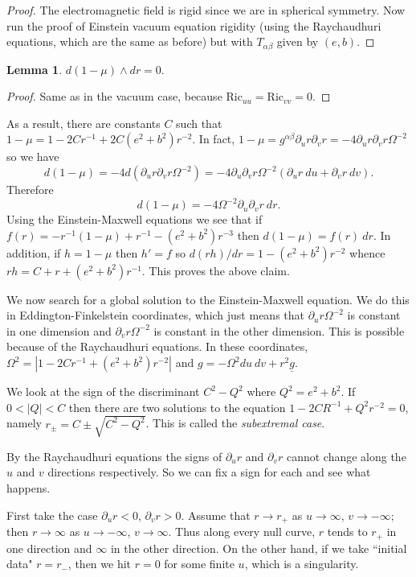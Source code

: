 \documentclass[12pt]{report}
\newcommand{\Ric}{\text{Ric}}
\newcommand{\dfn}[1]{\emph{#1}\index{#1}}
\theoremstyle{definition}
\newtheorem{lemma}[theorem]{Lemma}
\theoremstyle{remark}
\begin{document}
\begin{proof}
    The electromagnetic field is rigid since we are in spherical symmetry. Now run the proof of Einstein vacuum equation rigidity (using the Raychaudhuri equations, which are the same as before) but with $T_{\alpha\beta}$ given by $(e, b)$.
\end{proof}
\begin{lemma}
    $d(1 - \mu) \wedge dr = 0$.
\end{lemma}
\begin{proof}
    Same as in the vacuum case, because $\Ric_{uu} = \Ric_{vv} = 0$.
\end{proof}
As a result, there are constants $C$ such that $1 - \mu = 1 - 2Cr^{-1} + 2C(e^2 + b^2)r^{-2}$. In fact, $1 - \mu = g^{\alpha\beta} \partial_u r \partial_v r = -4\partial_u r \partial_vr \Omega^{-2}$ so we have
$$d(1 - \mu) = -4d(\partial_u r \partial_v r\Omega^{-2}) = -4 \partial_u\partial_vr \Omega^{-2} (\partial_ur ~du + \partial_vr ~dv).$$
Therefore
$$d(1 - \mu) = -4\Omega^{-2}\partial_u\partial_vr ~dr.$$
Using the Einstein-Maxwell equations we see that if $f(r) = -r^{-1}(1 - \mu) + r^{-1} - (e^2 + b^2)r^{-3}$ then $d(1 - \mu) = f(r) ~dr$. In addition, if $h = 1 - \mu$ then $h' = f$ so $d(rh)/dr = 1 - (e^2 + b^2)r^{-2}$ whence $rh = C + r + (e^2 + b^2)r^{-1}$. This proves the above claim.

We now search for a global solution to the Einstein-Maxwell equation. We do this in Eddington-Finkelstein coordinates, which just means that $\partial_ur \Omega^{-2}$ is constant in one dimension and $\partial_vr \Omega^{-2}$ is constant in the other dimension. This is possible because of the Raychaudhuri equations. In these coordinates, $\Omega^2 = |1 - 2Cr^{-1} + (e^2 + b^2)r^{-2}|$ and $g = -\Omega^2 du~dv + r^2 \underline g$.

We look at the sign of the discriminant $C^2 - Q^2$ where $Q^2 = e^2 + b^2$. If $0 < |Q| < C$ then there are two solutions to the equation $1 - 2CR^{-1} + Q^2r^{-2} = 0$, namely $r_\pm = C \pm \sqrt{C^2 - Q^2}$. This is called the \dfn{subextremal case}.

By the Raychaudhuri equations the signs of $\partial_ur$ and $\partial_vr$ cannot change along the $u$ and $v$ directions respectively. So we can fix a sign for each and see what happens.

First take the case $\partial_ur < 0$, $\partial_vr > 0$. Assume that $r \to r_+$ as $u \to \infty$, $v \to -\infty$; then $r \to \infty$ as $u \to -\infty$, $v \to \infty$. Thus along every null curve, $r$ tends to $r_+$ in one direction and $\infty$ in the other direction. On the other hand, if we take ``initial data" $r = r_-$, then we hit $r = 0$ for some finite $u$, which is a singularity.
\end{document}
